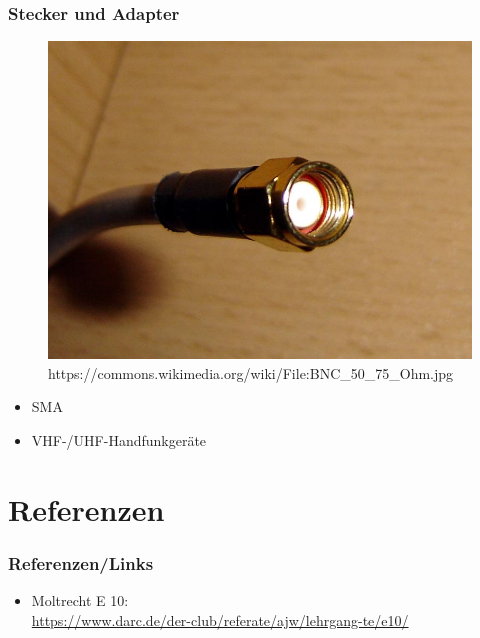 \begin{frame}
  \frametitle{Stecker und Adapter}
  \begin{center}
    \begin{figure}
      \includegraphics[width=.6\textwidth,height=.6\textheight,keepaspectratio]{e10/sma.jpg}
                    {https://commons.wikimedia.org/wiki/File:BNC_50_75_Ohm.jpg}{\ccpd}
    \end{figure}
    \begin{itemize}
      \item SMA
      \item VHF-/UHF-Handfunkgeräte
    \end{itemize}
  \end{center}
\end{frame}

\section*{Referenzen}
\begin{frame}
  \frametitle{Referenzen/Links}

    \footnotesize
    \begin{itemize}
      \item Moltrecht E 10: \\
        \url{https://www.darc.de/der-club/referate/ajw/lehrgang-te/e10/}
    \end{itemize}

\end{frame}


